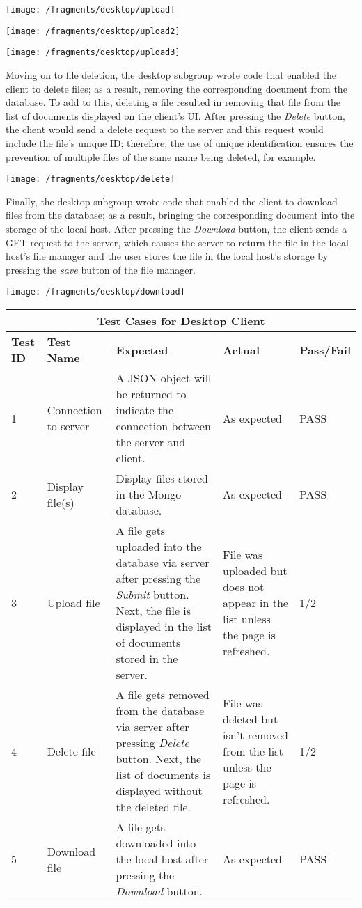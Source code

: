 \documentclass{article}
\begin{document}
\texttt{[image: /fragments/desktop/upload]}

\texttt{[image: /fragments/desktop/upload2]}

\texttt{[image: /fragments/desktop/upload3]}

Moving on to file deletion, the desktop subgroup wrote code that enabled the client to delete files; as a result, removing the corresponding document from the database. To add to this, deleting a file resulted in removing that file from the list of documents displayed on the client's UI. After pressing the \textit{Delete} button, the client would send a delete request to the server and this request would include the file's unique ID; therefore, the use of unique identification ensures the prevention of multiple files of the same name being deleted, for example. 

\texttt{[image: /fragments/desktop/delete]}

Finally, the desktop subgroup wrote code that enabled the client to download files from the database; as a result, bringing the corresponding document into the storage of the local host. After pressing the \textit{Download} button, the client sends a GET request to the server, which causes the server to return the file in the local host's file manager and the user stores the file in the local host's storage by pressing the \textit{save} button of the file manager. 

\texttt{[image: /fragments/desktop/download]}

\begin{tabular}{|p{2cm}|p{2cm}|p{3cm}|p{3cm}|p{3cm}|}
\hline
\multicolumn{5}{|c|}{\textbf{Test Cases for Desktop Client}} \\
\hline
\textbf{Test ID} & \textbf{Test Name} & \textbf{Expected} & \textbf{Actual} & \textbf{Pass/Fail} \\
\hline
1 & Connection to server & A JSON object will be returned to indicate the connection between the server and client.  & As expected & PASS \\
\hline
2 & Display file(s) & Display files stored in the Mongo database. & As expected & PASS \\
\hline
3 & Upload file & A file gets uploaded into the database via server after pressing the \textit{Submit} button. Next, the file is displayed in the list of documents stored in the server. & File was uploaded but does not appear in the list unless the page is refreshed. & 1/2 \\
\hline
4 & Delete file & A file gets removed from the database via server after pressing \textit{Delete} button. Next, the list of documents is displayed without the deleted file. & File was deleted but isn't removed from the list unless the page is refreshed. & 1/2 \\
\hline
5 & Download file & A file gets downloaded into the local host after pressing the \textit{Download} button. & As expected & PASS \\
\hline
\end{tabular}
\end{document}
